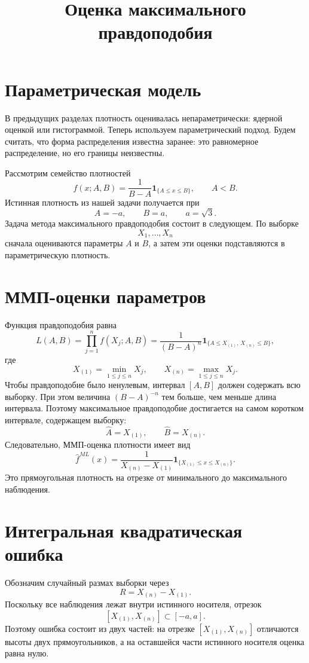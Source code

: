 \documentclass[12pt,a4paper]{article}
\begin{document}
\title{Оценка максимального правдоподобия}
\author{}
\date{}
\maketitle

\section*{Параметрическая модель}

В предыдущих разделах плотность оценивалась непараметрически: ядерной
оценкой или гистограммой. Теперь используем параметрический подход. Будем
считать, что форма распределения известна заранее: это равномерное
распределение, но его границы неизвестны.

Рассмотрим семейство плотностей
\[
f(x;A,B)=
\frac{1}{B-A}\mathbf 1_{\{A\le x\le B\}},
\qquad A<B.
\]
Истинная плотность из нашей задачи получается при
\[
A=-a,\qquad B=a,\qquad a=\sqrt{3}.
\]
Задача метода максимального правдоподобия состоит в следующем. По выборке
\[
X_1,\ldots,X_n
\]
сначала оцениваются параметры $A$ и $B$, а затем эти оценки подставляются в
параметрическую плотность.

\section*{ММП-оценки параметров}

Функция правдоподобия равна
\[
L(A,B)
=
\prod_{j=1}^n f(X_j;A,B)
=
\frac{1}{(B-A)^n}
\mathbf 1_{\{A\le X_{(1)},\, X_{(n)}\le B\}},
\]
где
\[
X_{(1)}=\min_{1\le j\le n}X_j,
\qquad
X_{(n)}=\max_{1\le j\le n}X_j.
\]
Чтобы правдоподобие было ненулевым, интервал $[A,B]$ должен содержать всю
выборку. При этом величина $(B-A)^{-n}$ тем больше, чем меньше длина
интервала. Поэтому максимальное правдоподобие достигается на самом коротком
интервале, содержащем выборку:
\[
\widehat A=X_{(1)},\qquad
\widehat B=X_{(n)}.
\]
Следовательно, ММП-оценка плотности имеет вид
\[
\widehat f^{ML}(x)
=
\frac{1}{X_{(n)}-X_{(1)}}
\mathbf 1_{\{X_{(1)}\le x\le X_{(n)}\}}.
\]
Это прямоугольная плотность на отрезке от минимального до максимального
наблюдения.

\section*{Интегральная квадратическая ошибка}

Обозначим случайный размах выборки через
\[
R=X_{(n)}-X_{(1)}.
\]
Поскольку все наблюдения лежат внутри истинного носителя, отрезок
\[
[X_{(1)},X_{(n)}]\subset[-a,a].
\]
Поэтому ошибка состоит из
двух частей: на отрезке $[X_{(1)},X_{(n)}]$ отличаются высоты двух
прямоугольников, а на оставшейся части истинного носителя оценка равна
нулю.
\end{document}
